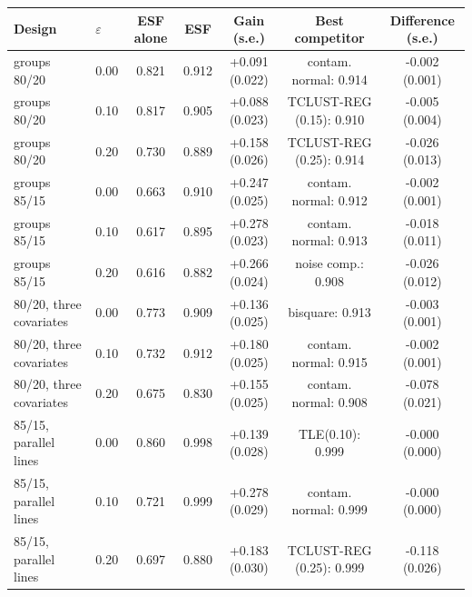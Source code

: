 \begin{tabular}{llccccc}
\toprule
Design & $\varepsilon$ & ESF alone & ESF & Gain (s.e.) & Best competitor & Difference (s.e.) \\
\midrule
groups 80/20 & 0.00 & 0.821 & 0.912 & +0.091 (0.022) & contam. normal: 0.914 & -0.002 (0.001) \\
groups 80/20 & 0.10 & 0.817 & 0.905 & +0.088 (0.023) & TCLUST-REG (0.15): 0.910 & -0.005 (0.004) \\
groups 80/20 & 0.20 & 0.730 & 0.889 & +0.158 (0.026) & TCLUST-REG (0.25): 0.914 & -0.026 (0.013) \\
groups 85/15 & 0.00 & 0.663 & 0.910 & +0.247 (0.025) & contam. normal: 0.912 & -0.002 (0.001) \\
groups 85/15 & 0.10 & 0.617 & 0.895 & +0.278 (0.023) & contam. normal: 0.913 & -0.018 (0.011) \\
groups 85/15 & 0.20 & 0.616 & 0.882 & +0.266 (0.024) & noise comp.: 0.908 & -0.026 (0.012) \\
80/20, three covariates & 0.00 & 0.773 & 0.909 & +0.136 (0.025) & bisquare: 0.913 & -0.003 (0.001) \\
80/20, three covariates & 0.10 & 0.732 & 0.912 & +0.180 (0.025) & contam. normal: 0.915 & -0.002 (0.001) \\
80/20, three covariates & 0.20 & 0.675 & 0.830 & +0.155 (0.025) & contam. normal: 0.908 & -0.078 (0.021) \\
85/15, parallel lines & 0.00 & 0.860 & 0.998 & +0.139 (0.028) & TLE(0.10): 0.999 & -0.000 (0.000) \\
85/15, parallel lines & 0.10 & 0.721 & 0.999 & +0.278 (0.029) & contam. normal: 0.999 & -0.000 (0.000) \\
85/15, parallel lines & 0.20 & 0.697 & 0.880 & +0.183 (0.030) & TCLUST-REG (0.25): 0.999 & -0.118 (0.026) \\
\bottomrule
\end{tabular}